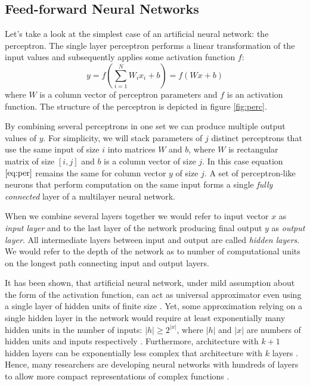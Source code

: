 \subsection{Feed-forward Neural Networks}
\label{ch:ffnn}

Let's take a look at the simplest case of an artificial neural network: the perceptron.
The single layer perceptron performs a linear transformation of the input values and subsequently applies some activation function $f$:
\begin{equation}\label{eq:per}
  y = f(\sum_{i=1}^N W_ix_i + b) = f(Wx+b)
\end{equation}
where $W$ is a column vector of perceptron parameters and $f$ is an activation function. The structure of the perceptron is depicted in figure \ref{fig:perc}.



By combining several perceptrons in one set we can produce multiple output values of $y$.
For simplicity, we will stack parameters of $j$ distinct perceptrons that use the same input of size $i$ into matrices $W$ and $b$, where $W$ is rectangular matrix of size $[i,j]$ and $b$ is a column vector of size $j$.
In this case equation $\ref{eq:per}$ remains the same for column vector $y$ of size $j$. A set of perceptron-like neurons that perform computation on the same input forms a single \textit{fully connected} layer of a multilayer neural network.

When we combine several layers together we would refer to input vector $x$ as \textit{input layer} and to the last layer of the network producing final output $y$ as \textit{output layer}. All intermediate layers between input and output are called \textit{hidden layers}. We would refer to the depth of the network as to number of computational units on the longest path connecting input and output layers.

It has been shown, that artificial neural network, under mild assumption about the form of the activation function, can act as universal approximator even using a single layer of hidden units of finite size \cite{Debao1993}. Yet, some approximation relying on a single hidden layer in the network would require at least exponentially many hidden units in the number of inputs: $|h| \geq 2^{|x|}$, where $|h|$ and $|x|$ are numbers of hidden units and inputs respectively \cite{Pascanu2014}. Furthermore, architecture with $k+1$ hidden layers can be exponentially less complex that architecture with $k$ layers \cite{Bengio2009a}.
Hence, many researchers are developing neural networks with hundreds of layers to allow more compact representations of complex functions \cite{He2015, Srivastava2015}.


